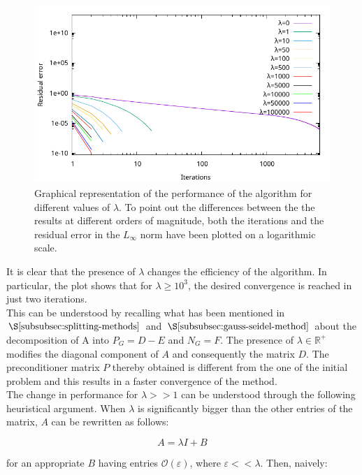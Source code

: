 \documentclass{article}
\theoremstyle{theorem}
\theoremstyle{definition}
\begin{document}
\begin{figure}[H]
	\begin{center}
		\includegraphics[width=1.0\textwidth]{Gauss_Seidel_lambda}
	\end{center}
	\caption{Graphical representation of the performance of the algorithm for different values of $\lambda$. To point out the differences between the the results at different orders of magnitude, both the iterations and the residual error in the $L_\infty$ norm have been plotted on a logarithmic scale.
		\label{fig:lambda}}
\end{figure} 

It is clear that the presence of $\lambda$ changes the efficiency of the algorithm. In particular, the plot shows that for $\lambda\ge10^3$, the desired convergence is reached in just two iterations.\\
This can be understood by recalling what has been mentioned in $\S\ref{subsubsec:splitting-methods}$ and $\S\ref{subsubsec:gauss-seidel-method}$ about the decomposition of A into $P_G=D-E$ and $N_G=F$. The presence of $\lambda\in\mathbb{R}^{+}$ modifies the diagonal component of $A$ and consequently the matrix $D$. The preconditioner matrix $P$ thereby obtained is different from the one of the initial problem and this results in a faster convergence of the method.\\

The change in performance for $\lambda>>1$ can be understood through the following heuristical argument. When $\lambda$ is significantly bigger than the other entries of the matrix, $A$ can be rewritten as follows:

$$A=\lambda I + B$$

for an appropriate $B$ having entries $\mathcal{O}(\varepsilon)$, where $\varepsilon << \lambda$.  Then, naively:
\end{document}
